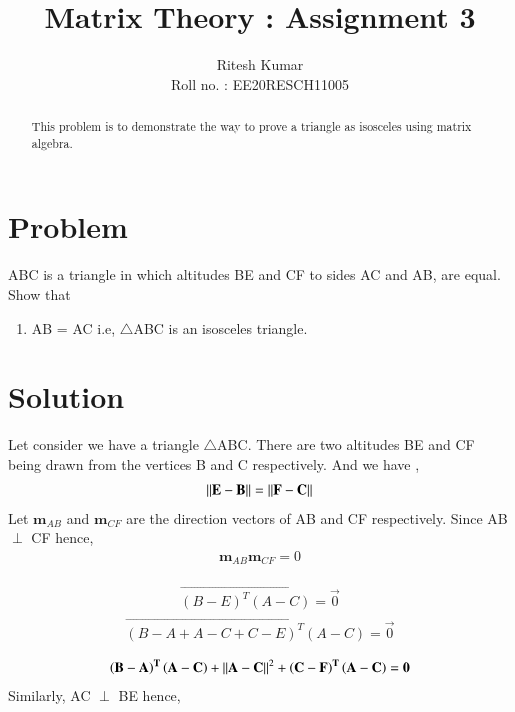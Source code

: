 \documentclass[journal,12pt,twocolumn]{IEEEtran}
\begin{document}
     \def\rightbox#1{\makebox[0in][r]{#1}}
     \def\centbox#1{\makebox[0in]{#1}}
     \def\topbox#1{\raisebox{-\baselineskip}[0in][0in]{#1}}
     \def\midbox#1{\raisebox{-0.5\baselineskip}[0in][0in]{#1}}
\vspace{3cm}
\title{ Matrix Theory : Assignment 3 }
\author{Ritesh Kumar \\ Roll no. : EE20RESCH11005 }
\maketitle
\newpage
\bigskip
\renewcommand{\thefigure}{\theenumi}
\renewcommand{\thetable}{\theenumi}
\begin{abstract}
This problem is to demonstrate the way to prove a triangle as isosceles using matrix algebra.
\end{abstract}

\section{Problem}
ABC is a triangle in which altitudes BE and CF to sides AC and AB, are equal. Show that 
\begin{enumerate}
	\item AB = AC  i.e, $\triangle$ABC is an isosceles triangle.
\end{enumerate}
\section{Solution}
Let consider we have a triangle $\triangle$ABC. There are two altitudes BE and CF being  drawn from the vertices B and C respectively. And we have ,
 \begin{align}
 	\left\lVert\mathbf{E - B}\right\rVert = \left\lVert\mathbf{F - C}\right\rVert \label{eq2.1}
 \end{align}
Let $\textbf{m}_{AB}$ and $\textbf{m}_{CF}$ are the direction vectors of AB and CF respectively. Since AB $\perp$ CF hence,
\begin{align}
 \textbf{m}_{AB} \textbf{m}_{CF} = 0
\end{align}

\begin{align}
 \vec{\left( B - E\right)^T \left(A - C \right)} =\vec{ 0}
\end{align}
\begin{align}
\vec{\left( B -  A + A - C + C - E\right)^T \left(A - C \right)} = \vec{0}
\end{align}

  \begin{align}
 \mathbf{ \left( B -  A \right)^T \left(A - C \right)} + \left\lVert\mathbf {A - C}\right\rVert^{2} + \mathbf{\left(C - F\right)^T \left(A - C \right)} = \mathbf{0} \label{2.5}
  \end{align}
Similarly, AC $\perp$ BE hence,  
\end{document}
